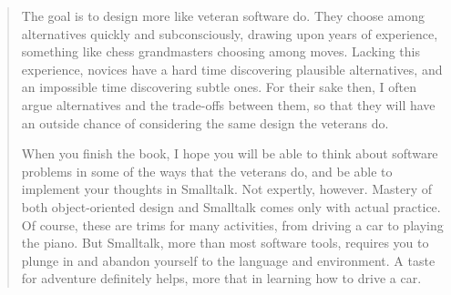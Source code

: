 \begin{quote}
        The goal is to design more like veteran software do. They choose among
    alternatives quickly and subconsciously, drawing upon years of experience,
    something like chess grandmasters choosing among moves. Lacking this experience,
    novices have a hard time discovering plausible alternatives, and an impossible
    time discovering subtle ones. For their sake then, I often argue alternatives
    and the trade-offs between them, so that they will have an outside chance of
    considering the same design the veterans do.

        When you finish the book, I hope you will be able to think about software
    problems in some of the ways that the veterans do, and be able to implement your
    thoughts in Smalltalk. Not expertly, however. Mastery of both object-oriented
    design and Smalltalk comes only with actual practice. Of course, these are trims
    for many activities, from driving a car to playing the piano. But Smalltalk,
    more than most software tools, requires you to plunge in and abandon yourself
    to the language and environment. A taste for adventure definitely helps, more
    that in learning how to drive a car.
\end{quote}
